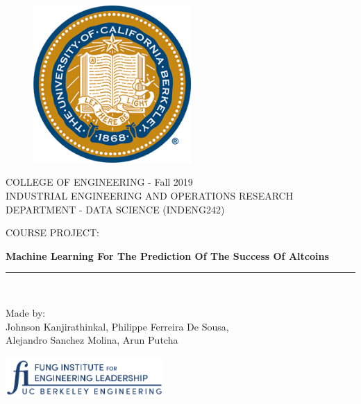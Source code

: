 \documentclass[11pt, english, letterpaper]{article}
\begin{document}
\begin{titlepage}

\begin{center}
\begin{figure}[htb]
\begin{center}
\includegraphics[width=6cm]{ucbseal.png}
\end{center}
\end{figure}

\vspace*{0.5in}
\Large{COLLEGE OF ENGINEERING - Fall 2019}\\
\vspace*{0.15in}
\Large{INDUSTRIAL ENGINEERING AND OPERATIONS RESEARCH DEPARTMENT - DATA SCIENCE (INDENG242)} \\
\vspace*{0.8in}
\begin{Large}
COURSE PROJECT:\\
\end{Large}
\vspace*{0.2in}
\begin{huge}
\textbf{Machine Learning For The Prediction Of The Success Of Altcoins} \\
\end{huge}
\vspace*{0.4in}
\rule{80mm}{0.1mm}\\
\vspace*{0.1in}
\begin{Large}
Made by: \\
Johnson Kanjirathinkal, Philippe Ferreira De Sousa, \\
Alejandro Sanchez Molina, Arun Putcha\\
\end{Large}
\vspace*{0.3in}
\includegraphics[width=6cm]{FungInstitute-logo.png}
\end{center}
\end{titlepage}
\end{document}
